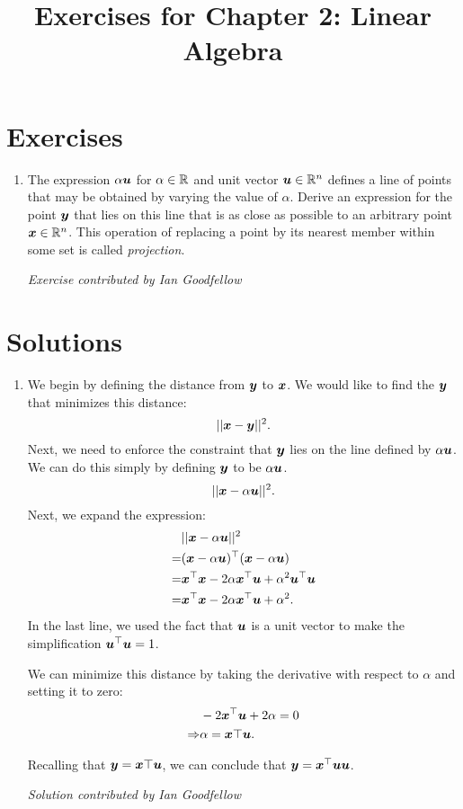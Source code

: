 \documentclass{article}
\title{Exercises for Chapter 2: Linear Algebra}
\begin{document}
\maketitle

\section*{Exercises}
\begin{enumerate}
\item The expression $\alpha {\bm{u}}$ for $\alpha \in \mathbb{R}$ and
unit vector ${\bm{u}} \in \mathbb{R}^n$ defines a line of points that may be obtained by varying the
value of $\alpha$.
Derive an expression for the point ${\bm{y}}$ that lies on this line that is
as close as possible to an arbitrary point ${\bm{x}} \in \mathbb{R}^n$.
This operation of replacing a point by its nearest member within some set
is called {\em projection}.


{\em Exercise contributed by Ian Goodfellow}
\end{enumerate}

\section*{Solutions}
\begin{enumerate}
\item We begin by defining the distance from ${\bm{y}}$ to ${\bm{x}}$. We would like to
find the ${\bm{y}}$ that minimizes this distance:
\begin{equation}
|| {\bm{x}} - {\bm{y}}||^2.
\end{equation}
Next, we need to enforce the constraint that ${\bm{y}}$ lies on the line defined
by $\alpha {\bm{u}}$. We can do this simply by defining ${\bm{y}}$ to be $\alpha {\bm{u}}$.
\begin{equation}
|| {\bm{x}} - \alpha {\bm{u}} ||^2.
\end{equation}
Next, we expand the expression:
\begin{align}
& || {\bm{x}} - \alpha {\bm{u}} ||^2 \\
=& ( {\bm{x}} - \alpha {\bm{u}} )^\top ({\bm{x}} - \alpha {\bm{u}}) \\
=& {\bm{x}}^\top {\bm{x}} - 2 \alpha {\bm{x}}^\top {\bm{u}} + \alpha^2 {\bm{u}}^\top {\bm{u}} \\
=& {\bm{x}}^\top {\bm{x}} - 2 \alpha {\bm{x}}^\top {\bm{u}} + \alpha^2.
\end{align}
In the last line, we used the fact that ${\bm{u}}$ is a unit vector to make
the simplification ${\bm{u}}^\top {\bm{u}} = 1$.

We can minimize this distance by taking the derivative with respect to
$\alpha$ and setting it to zero:
\begin{align}
& - 2  {\bm{x}}^\top {\bm{u}} + 2 \alpha = 0 \\
\Rightarrow & \alpha = {\bm{x}}\top {\bm{u}}.
\end{align}

Recalling that ${\bm{y}} = {\bm{x}}\top {\bm{u}}$, we can conclude that ${\bm{y}} = {\bm{x}}^\top {\bm{u}} {\bm{u}}$.

{\em Solution contributed by Ian Goodfellow}


\end{enumerate}
\end{document}
